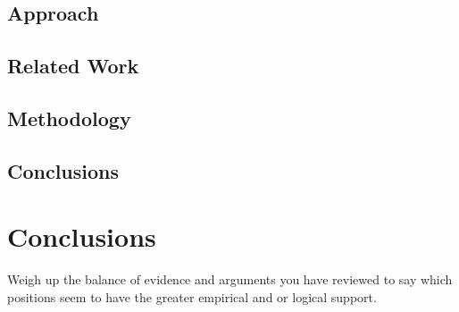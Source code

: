 \documentclass[a4paper,portrait,12pt]{article}
\begin{document}
\subsection{Approach}

\subsection{Related Work}

\subsection{Methodology}

\subsection{Conclusions}

\section{Conclusions}

Weigh up the balance of evidence and arguments you have reviewed to say which
positions seem to have the greater empirical and or logical support.



\end{document}
